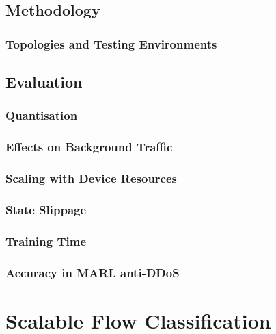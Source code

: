 \documentclass[twoside,hidelinks]{glasgowthesis}
\begin{document}
\section{Methodology}

\subsection{Topologies and Testing Environments}

\section{Evaluation}

\subsection{Quantisation}

\subsection{Effects on Background Traffic}

\subsection{Scaling with Device Resources}

\subsection{State Slippage}

\subsection{Training Time}

\subsection{Accuracy in MARL anti-DDoS}




\chapter{Scalable Flow Classification}\label{chap:seidr}
\end{document}
